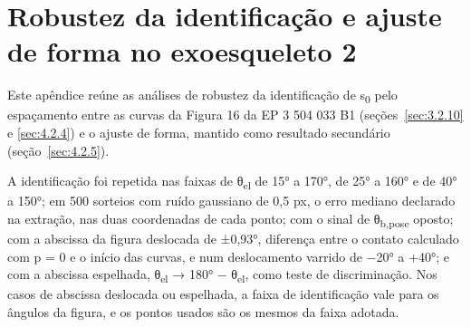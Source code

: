 
\chapter{Robustez da identificação e ajuste de forma no exoesqueleto 2}\label{sec:apA}

Este apêndice reúne as análises de robustez da identificação de s\textsubscript{0} pelo espaçamento entre as curvas da Figura 16 da EP 3 504 033 B1 (seções~\ref{sec:3.2.10} e \ref{sec:4.2.4}) e o ajuste de forma, mantido como resultado secundário (seção~\ref{sec:4.2.5}).

A identificação foi repetida nas faixas de θ\textsubscript{el} de 15° a 170°, de 25° a 160° e de 40° a 150°; em 500 sorteios com ruído gaussiano de 0,5 px, o erro mediano declarado na extração, nas duas coordenadas de cada ponto; com o sinal de θ\textsubscript{b,pose} oposto; com a abscissa da figura deslocada de ±0,93°, diferença entre o contato calculado com p = 0 e o início das curvas, e num deslocamento varrido de −20° a +40°; e com a abscissa espelhada, θ\textsubscript{el} → 180° − θ\textsubscript{el}, como teste de discriminação. Nos casos de abscissa deslocada ou espelhada, a faixa de identificação vale para os ângulos da figura, e os pontos usados são os mesmos da faixa adotada.

